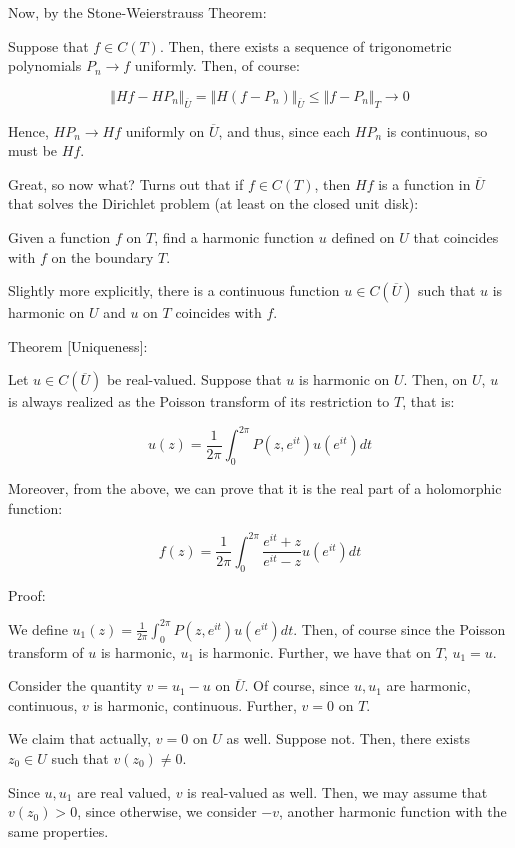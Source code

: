 \documentclass[10pt]{article}
\begin{document}
Now, by the Stone-Weierstrauss Theorem:

Suppose that $f \in C(T)$. Then, there exists a sequence of trigonometric polynomials $P_n \to f$ uniformly. Then, of course:

$$ \Vert Hf - HP_n \Vert_{\overline{U}} = \Vert H(f - P_n)  \Vert_{\overline{U}}  \leq \Vert f - P_n \Vert_T \to 0$$

Hence, $HP_n \to Hf$ uniformly on $\overline{U}$, and thus, since each $HP_n$ is continuous, so must be $Hf$. 

Great, so now what? Turns out that if $f \in C(T)$, then $Hf$ is a function in $\overline{U}$ that solves the Dirichlet problem (at least on the closed unit disk):

Given a function $f$ on $T$, find a harmonic function $u$ defined on $U$ that coincides with $f$ on the boundary $T$. 

Slightly more explicitly, there is a continuous function $u \in C(\overline{U})$ such that $u$ is harmonic on $U$ and $u$ on $T$ coincides with $f$. 

Theorem [Uniqueness]:

Let $u \in C(\overline{U})$ be real-valued. Suppose that $u$ is harmonic on $U$. Then, on $U$, $u$ is always realized as the Poisson transform of its restriction to $T$, that is:

$$ u(z) = \frac{1}{2\pi} \int_0^{2\pi} P(z,e^{it}) u(e^{it}) dt $$

Moreover, from the above, we can prove that it is the real part of a holomorphic function:

$$ f(z) = \frac{1}{2\pi} \int_0^{2\pi} \frac{e^{it} + z}{e^{it} - z} u(e^{it}) dt$$

Proof:

We define $u_1(z) = \frac{1}{2\pi} \int_0^{2\pi} P(z,e^{it}) u(e^{it}) dt$. Then, of course since the Poisson transform of $u$ is harmonic, $u_1$ is harmonic. Further, we have that on $T$, $u_1 = u$.

Consider the quantity $v = u_1 - u$ on $\overline{U}$. Of course, since $u, u_1$ are harmonic, continuous, $v$ is harmonic, continuous. Further, $v = 0$ on $T$.

We claim that actually, $v = 0$ on $U$ as well. Suppose not. Then, there exists $z_0 \in U$ such that $v(z_0) \not = 0$.

Since $u, u_1$ are real valued, $v$ is real-valued as well. Then, we may assume that $v(z_0) > 0$, since otherwise, we consider $-v$, another harmonic function with the same properties.
\end{document}
